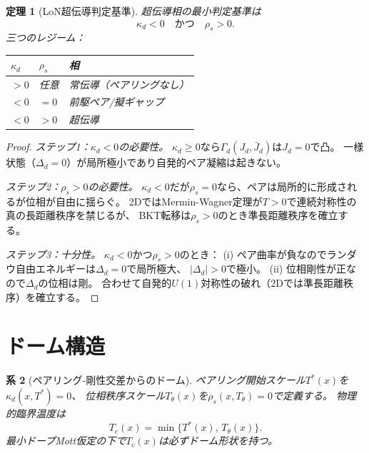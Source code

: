 \documentclass[12pt]{article}
\theoremstyle{plain}
\newtheorem{theorem}{定理}[section]
\newtheorem{corollary}[theorem]{系}
\theoremstyle{definition}
\numberwithin{equation}{section}
\begin{document}
\begin{theorem}[LoN超伝導判定基準]\label{thm:SCcriterion}
超伝導相の最小判定基準は
\begin{equation}
\boxed{\kappa_d < 0 \quad\text{かつ}\quad \rho_s > 0.}
\end{equation}
三つのレジーム：
\begin{center}
\begin{tabular}{lll}
\toprule
$\kappa_d$ & $\rho_s$ & 相\\
\midrule
$>0$ & 任意 & 常伝導（ペアリングなし）\\
$<0$ & $=0$ & 前駆ペア/擬ギャップ\\
$<0$ & $>0$ & 超伝導\\
\bottomrule
\end{tabular}
\end{center}
\end{theorem}

\begin{proof}
\emph{ステップ1：$\kappa_d<0$の必要性。}
$\kappa_d\geq 0$なら$\Gamma_d(J_d,\bar{J}_d)$は$J_d=0$で凸。
一様状態（$\Delta_d=0$）が局所極小であり自発的ペア凝縮は起きない。

\emph{ステップ2：$\rho_s>0$の必要性。}
$\kappa_d<0$だが$\rho_s=0$なら、ペアは局所的に形成されるが位相が自由に揺らぐ。
2DではMermin-Wagner定理が$T>0$で連続対称性の真の長距離秩序を禁じるが、
BKT転移は$\rho_s>0$のとき準長距離秩序を確立する。

\emph{ステップ3：十分性。}
$\kappa_d<0$かつ$\rho_s>0$のとき：
(i) ペア曲率が負なのでランダウ自由エネルギーは$\Delta_d=0$で局所極大、
$|\Delta_d|>0$で極小。
(ii) 位相剛性が正なので$\Delta_d$の位相は剛。
合わせて自発的$U(1)$対称性の破れ（2Dでは準長距離秩序）を確立する。
\end{proof}


\section{ドーム構造}\label{sec:dome}

\begin{corollary}[ペアリング-剛性交差からのドーム]\label{cor:dome}
ペアリング開始スケール$T^*(x)$を$\kappa_d(x,T^*)=0$、
位相秩序スケール$T_\theta(x)$を$\rho_s(x,T_\theta)=0$で定義する。
物理的臨界温度は
\begin{equation}
\boxed{T_c(x) = \min\{T^*(x),\,T_\theta(x)\}.}
\end{equation}
最小ドープMott仮定の下で$T_c(x)$は必ずドーム形状を持つ。
\end{corollary}
\end{document}
